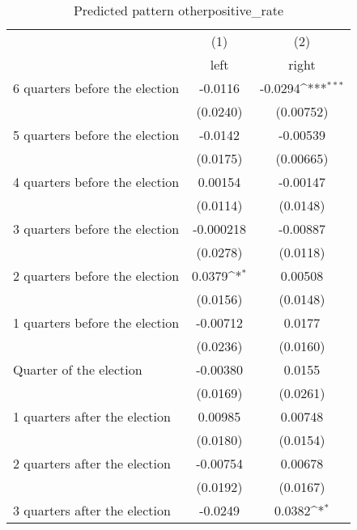 \begin{table}[htbp]\centering
\def\sym#1{\ifmmode^{#1}\else\(^{#1}\)\fi}
\caption{Predicted pattern otherpositive\_rate}
\begin{tabular}{l*{2}{c}}
\hline\hline
                    &\multicolumn{1}{c}{(1)}&\multicolumn{1}{c}{(2)}\\
                    &\multicolumn{1}{c}{left}&\multicolumn{1}{c}{right}\\
\hline
 6 quarters before the election&     -0.0116         &     -0.0294\sym{***}\\
                    &    (0.0240)         &   (0.00752)         \\
[1em]
 5 quarters before the election&     -0.0142         &    -0.00539         \\
                    &    (0.0175)         &   (0.00665)         \\
[1em]
 4 quarters before the election&     0.00154         &    -0.00147         \\
                    &    (0.0114)         &    (0.0148)         \\
[1em]
 3 quarters before the election&   -0.000218         &    -0.00887         \\
                    &    (0.0278)         &    (0.0118)         \\
[1em]
 2 quarters before the election&      0.0379\sym{*}  &     0.00508         \\
                    &    (0.0156)         &    (0.0148)         \\
[1em]
 1 quarters before the election&    -0.00712         &      0.0177         \\
                    &    (0.0236)         &    (0.0160)         \\
[1em]
Quarter of the election&    -0.00380         &      0.0155         \\
                    &    (0.0169)         &    (0.0261)         \\
[1em]
 1 quarters after the election&     0.00985         &     0.00748         \\
                    &    (0.0180)         &    (0.0154)         \\
[1em]
 2 quarters after the election&    -0.00754         &     0.00678         \\
                    &    (0.0192)         &    (0.0167)         \\
[1em]
 3 quarters after the election&     -0.0249         &      0.0382\sym{*}  \\

\end{tabular}
\end{table}
